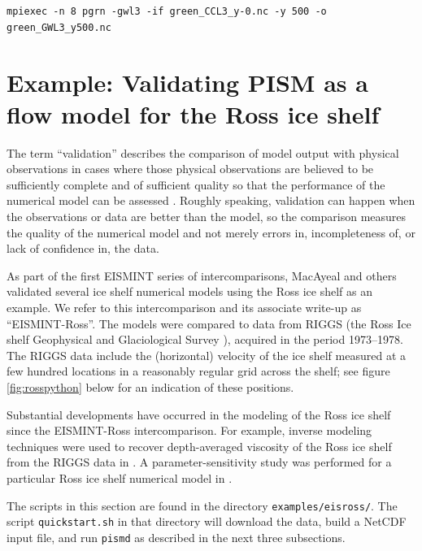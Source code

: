 \documentclass[11pt,final]{amsart}
\begin{document}
\verb|mpiexec -n 8 pgrn -gwl3 -if green_CCL3_y-0.nc -y 500 -o green_GWL3_y500.nc|




\clearpage\newpage
\section{Example: Validating PISM as a flow model for the Ross ice shelf}\label{sect:ross}     The term ``validation'' describes the comparison of model output with physical observations in cases where those physical observations are believed to be sufficiently complete and of sufficient quality so that the performance of the numerical model can be assessed \cite{Roache,Wesseling}.  Roughly speaking, validation can happen when the observations or data are better than the model, so the comparison measures the quality of the numerical model and not merely errors in, incompleteness of, or lack of confidence in, the data.

As part of the first EISMINT series of intercomparisons, MacAyeal and others \cite{MacAyealetal} validated several ice shelf numerical models using the Ross ice shelf as an example.  We refer to this intercomparison and its associate write-up \cite{MacAyealetal} as ``EISMINT-Ross''.  The models were compared to data from RIGGS (the Ross Ice shelf Geophysical and Glaciological Survey \cite{RIGGS2,RIGGS1}), acquired in the period 1973--1978.   The RIGGS data include the (horizontal) velocity of the ice shelf measured at a few hundred locations in a reasonably regular grid across the shelf; see figure \ref{fig:rosspython} below for an indication of these positions.

Substantial developments have occurred in the modeling of the Ross ice shelf since the EISMINT-Ross intercomparison.  For example, inverse modeling techniques were used to recover depth-averaged viscosity of the Ross ice shelf from the RIGGS data in \cite{RommelaereMacAyeal}. A parameter-sensitivity study was performed for a particular Ross ice shelf numerical model in \cite{HumbertGreveHutter}.

The scripts in this section are found in the directory \verb|examples/eisross/|.  The script \verb|quickstart.sh| in that directory will download the data, build a NetCDF input file, and run \verb|pismd| as described in the next three subsections.
\end{document}
